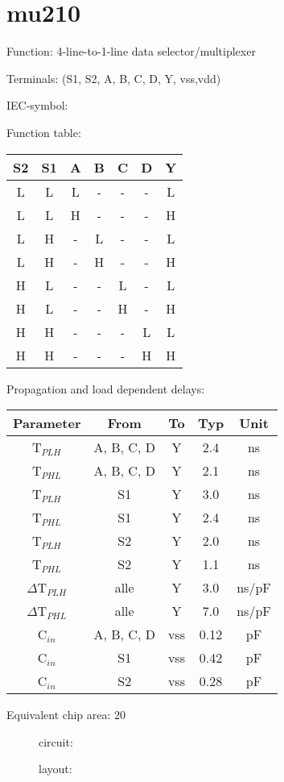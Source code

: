 \section{mu210}

Function: 4-line-to-1-line data selector/multiplexer

Terminals: (S1, S2, A, B, C, D, Y, vss,vdd)


IEC-symbol:
\begin{figure}[bth]
\end{figure}

Function table:
\begin{table}[bth]
\begin{tabular}{|cc|cccc||c|}
\hline
S2	&S1	&A 	&B	&C	&D	&Y\\
\hline
L	&L	&L	&-	&-	&-	&L\\
L	&L	&H	&-	&-	&-	&H\\
L	&H	&- 	&L	&-	&-	&L\\
L	&H	&-	&H	&-	&-	&H\\
H	&L	&-	&-	&L	&-	&L\\
H	&L	&-	&-	&H	&-	&H\\
H	&H	&-	&-	&-	&L	&L\\
H	&H	&-	&-	&-	&H	&H\\
\hline
\end{tabular}
\vspace{1cm}

	
Propagation and load dependent delays:\\

\begin{tabular}{|c|c|c|c|c|}
\hline
Parameter		&From		&To 	&Typ	&Unit\\
\hline
T$_{PLH}$		&A, B, C, D	&Y	&2.4	&ns\\
T$_{PHL}$		&A, B, C, D	&Y	&2.1	&ns\\
T$_{PLH}$		&S1		&Y	&3.0	&ns\\
T$_{PHL}$		&S1		&Y	&2.4	&ns\\
T$_{PLH}$		&S2		&Y	&2.0	&ns\\
T$_{PHL}$		&S2		&Y	&1.1	&ns\\
\hline
$\Delta$T$_{PLH}$	&alle		&Y	&3.0	&ns/pF\\
$\Delta$T$_{PHL}$	&alle		&Y	&7.0	&ns/pF\\
\hline	
C$_{in}$		&A, B, C, D	&vss	&0.12	&pF\\
C$_{in}$		&S1		&vss	&0.42	&pF\\
C$_{in}$		&S2		&vss	&0.28	&pF\\
\hline
\end{tabular}
\end{table}

Equivalent chip area: 20


\begin{figure}[bth]
circuit:\\

\end{figure}

\begin{figure}[bth]
layout:\\

\end{figure}

\clearpage
